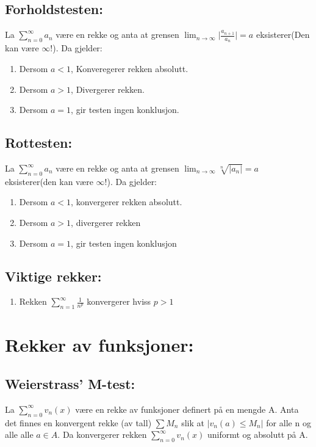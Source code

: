 \documentclass[8pt,a4paper,twocolumn,twoside]{article}
\def\abs#1{\lvert #1 \rvert}
\def\suminfty#1#2{\sum_{n=#1}^\infty #2}
\begin{document}
        \subsection*{Forholdstesten:}
        La $\suminfty{0}{a_n}$ være en rekke og anta at grensen $\lim_{n\to\infty}\abs{\frac{a_{n+1}}{a_n}}=a$ eksisterer(Den kan være $\infty$!). Da gjelder:
        \begin{enumerate}
            \item Dersom $a<1$, Konveregerer rekken absolutt.
            \item Dersom $a>1$, Divergerer rekken.
            \item Dersom $a=1$, gir testen ingen konklusjon.
        \end{enumerate}
        \subsection*{Rottesten:}
        La $\suminfty{0}{a_n}$ være en rekke og anta at grensen $\lim_{n\to\infty}\sqrt[n]{\abs{a_n}}=a$ eksisterer(den kan være $\infty$!). Da gjelder:
        \begin{enumerate}
            \item Dersom $a<1$, konvergerer rekken absolutt.
            \item Dersom $a>1$, divergerer rekken
            \item Dersom $a=1$, gir testen ingen konklusjon
        \end{enumerate}
        \subsection*{Viktige rekker:}
        \begin{enumerate}
            \item Rekken $\sum_{n=1}^\infty \frac{1}{n^p}$ konvergerer hviss $p > 1$ 
        \end{enumerate}
    \section*{Rekker av funksjoner:}
        \subsection*{Weierstrass' M-test:}
        La $\suminfty{0}{v_n(x)}$ være en rekke av funksjoner definert på en mengde A. Anta det finnes en konvergent rekke (av tall) $\sum M_n$ slik at 
        $\abs{v_n(a) \leq M_n}$ for alle n og alle alle $a\in A$. Da konvergerer rekken $\suminfty{0}{v_n(x)}$ uniformt og absolutt på A.
\end{document}
